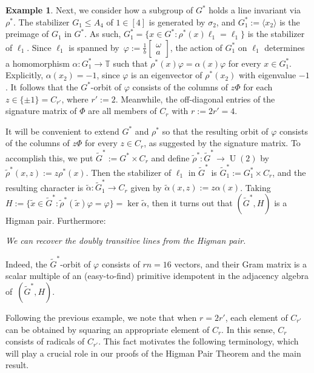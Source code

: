 \documentclass[11pt]{article}
\theoremstyle{definition}
\newtheorem{example}[theo]{Example}
\numberwithin{equation}{section}
\begin{document}
\begin{example}
Next, we consider how a subgroup of $G^*$ holds a line invariant via $\rho^*$.
The stabilizer $G_1 \leq A_4$ of $1\in[4]$ is generated by $\sigma_2$, and $G_1^*:=\langle x_2\rangle$ is the preimage of $G_1$ in $G^*$.
As such, $G_1^*={\{x\in G^*:}\rho^*(x)\ell_1=\ell_1\}$ is the stabilizer of $\ell_1$.
Since $\ell_1$ is spanned by~$\varphi:=\frac{1}{b}\left[\begin{smallmatrix}\omega\\a\end{smallmatrix}\right]$, the action of $G_1^*$ on $\ell_1$ determines a homomorphism $\alpha\colon G_1^*\to\mathbb{T}$ such that $\rho^*(x)\varphi=\alpha(x)\varphi$ for every $x\in G_1^*$.
Explicitly, $\alpha(x_2)=-1$, since $\varphi$ is an eigenvector of $\rho^*(x_2)$ with eigenvalue $-1$.
It follows that the $G^*$-orbit of $\varphi$ consists of the columns of $z\Phi$ for each $z\in\{\pm1\}=C_{r'}$, where $r':=2$.
Meanwhile, the off-diagonal entries of the signature matrix of $\Phi$ are all members of $C_r$ with $r:=2r'=4$.

It will be convenient to extend $G^*$ and $\rho^*$ so that the resulting orbit of $\varphi$ consists of the columns of $z\Phi$ for every $z\in C_r$, as suggested by the signature matrix.
To accomplish this, we put $\tilde{G}^*:=G^*\times C_r$ and define $\tilde{\rho}^*\colon \tilde{G}^*\to\operatorname{U}(2)$ by $\tilde{\rho}^*(x,z):=z\rho^*(x)$.
Then the stabilizer of $\ell_1$ in $\tilde{G}^*$ is $\tilde{G}^*_1:=G^*_1\times C_r$, and the resulting character is $\tilde{\alpha}\colon\tilde{G}^*_1\to C_r$ given by $\tilde{\alpha}(x,z):=z\alpha(x)$.
Taking $H:=\{\tilde{x}\in\tilde{G}^*:\tilde{\rho}^*(\tilde{x})\varphi=\varphi\}=\operatorname{ker}\tilde{\alpha}$, then it turns out that $(\tilde{G}^*,H)$ is a Higman pair.
Furthermore:
\begin{center}
\textit{We can recover the doubly transitive lines from the Higman pair.}
\end{center}
Indeed, the $\tilde{G}^*$-orbit of $\varphi$ consists of $rn=16$ vectors, and their Gram matrix is a scalar multiple of an (easy-to-find) primitive idempotent in the adjacency algebra of~$(\tilde{G}^*,H)$.
\end{example}

Following the previous example, we note that when $r = 2r'$, each element of $C_{r'}$ can be obtained by squaring an appropriate element of $C_r$.
In this sense, $C_r$ consists of radicals of $C_{r'}$.
This fact motivates the following terminology, which will play a crucial role in our proofs of the Higman Pair Theorem and the main result.
\end{document}
